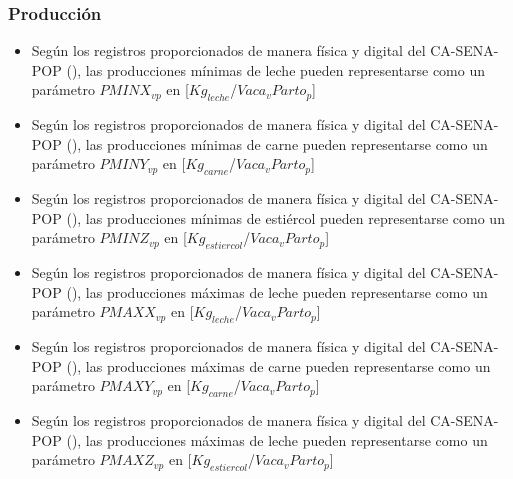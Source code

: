 \subsubsection{Producción}
\begin{itemize}
    \item Según los registros proporcionados de manera física y digital del CA-SENA-POP (\cite{casena}), las producciones mínimas de leche pueden representarse como un parámetro $PMINX_{vp}$ en [$Kg_{leche}$/$Vaca_{v}Parto_{p}$]
    \item Según los registros proporcionados de manera física y digital del CA-SENA-POP (\cite{casena}), las producciones mínimas de carne pueden representarse como un parámetro $PMINY_{vp}$ en [$Kg_{carne}$/$Vaca_{v}Parto_{p}$]
    \item Según los registros proporcionados de manera física y digital del CA-SENA-POP (\cite{casena}), las producciones mínimas de estiércol pueden representarse como un parámetro $PMINZ_{vp}$ en [$Kg_{estiercol}$/$Vaca_{v}Parto_{p}$]
    \item Según los registros proporcionados de manera física y digital del CA-SENA-POP (\cite{casena}), las producciones máximas de leche pueden representarse como un parámetro $PMAXX_{vp}$ en [$Kg_{leche}$/$Vaca_{v}Parto_{p}$]
     \item Según los registros proporcionados de manera física y digital del CA-SENA-POP (\cite{casena}), las producciones máximas de carne pueden representarse como un parámetro $PMAXY_{vp}$ en [$Kg_{carne}$/$Vaca_{v}Parto_{p}$]
      \item Según los registros proporcionados de manera física y digital del CA-SENA-POP (\cite{casena}), las producciones máximas de leche pueden representarse como un parámetro $PMAXZ_{vp}$ en [$Kg_{estiercol}$/$Vaca_{v}Parto_{p}$]
\end{itemize}



